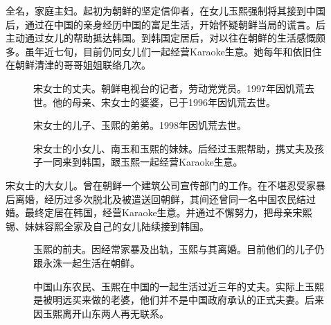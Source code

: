 \begin{description}
	\item[] 全名，家庭主妇。起初为朝鲜的坚定信仰者，在女儿玉熙强制将其接到中国后，通过在中国的亲身经历中国的富足生活，开始怀疑朝鲜当局的谎言。后主动通过女儿的帮助抵达韩国。到韩国定居后，对以往在朝鲜的生活感慨颇多。虽年近七旬，目前仍同女儿们一起经营Karaoke生意。她每年和依旧住在朝鲜清津的哥哥姐姐联络几次。
		{\footnotesize \begin{description}
			\item[] 宋女士的丈夫。朝鲜电视台的记者，劳动党党员。1997年因饥荒去世。他的母亲、宋女士的婆婆，已于1996年因饥荒去世。
			\item[] 宋女士的儿子、玉熙的弟弟。1998年因饥荒去世。
			\item[] 宋女士的小女儿、南玉和玉熙的妹妹。后经过玉熙帮助，携丈夫及孩子一同来到韩国，跟玉熙一起经营Karaoke生意。
		\end{description}}
		
	\item[] 宋女士的大女儿。曾在朝鲜一个建筑公司宣传部门的工作。在不堪忍受家暴后离婚，经历过多次脱北及被遣送回朝鲜，其间还曾同一名中国农民结过婚。最终定居在韩国，经营Karaoke生意。并通过不懈努力，把母亲宋熙锡、妹妹容熙全家及自己的女儿陆续接到韩国。
		{\footnotesize \begin{description}
			\item[] 玉熙的前夫。因经常家暴及出轨，玉熙与其离婚。目前他们的儿子仍跟永洙一起生活在朝鲜。
			\item[] 中国山东农民、玉熙在中国的一起生活过近三年的丈夫。实际上玉熙是被明远买来做的老婆，他们并不是中国政府承认的正式夫妻。后来因玉熙离开山东两人再无联系。
		\end{description}}


\end{description}
